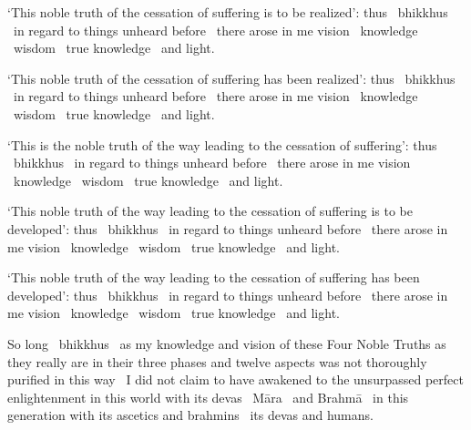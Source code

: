 \begin{english-hang}
`This noble truth of the cessation of suffering is to be realized': thus \breathmark\ bhikkhus \breathmark\ in regard to things unheard before \breathmark\ there arose in me vision \breathmark\ knowledge \breathmark\ wisdom \breathmark\ true knowledge \breathmark\ and light.
\end{english-hang}

\begin{english-hang}
`This noble truth of the cessation of suffering has been realized': thus \breathmark\ bhikkhus \breathmark\ in regard to things unheard before \breathmark\ there arose in me vision \breathmark\ knowledge \breathmark\ wisdom \breathmark\ true knowledge \breathmark\ and light.
\end{english-hang}

\begin{english-hang}
`This is the noble truth of the way leading to the cessation of suffering': thus \breathmark\ bhikkhus \breathmark\ in regard to things unheard before \breathmark\ there arose in me vision \breathmark\ knowledge \breathmark\ wisdom \breathmark\ true knowledge \breathmark\ and light.
\end{english-hang}

\begin{english-hang}
`This noble truth of the way leading to the cessation of suffering is to be developed': thus \breathmark\ bhikkhus \breathmark\ in regard to things unheard before \breathmark\ there arose in me vision \breathmark\ knowledge \breathmark\ wisdom \breathmark\ true knowledge \breathmark\ and light.
\end{english-hang}

\begin{english-hang}
`This noble truth of the way leading to the cessation of suffering has been developed': thus \breathmark\ bhikkhus \breathmark\ in regard to things unheard before \breathmark\ there arose in me vision \breathmark\ knowledge \breathmark\ wisdom \breathmark\ true knowledge \breathmark\ and light.
\end{english-hang}

\begin{english-hang}
So long \breathmark\ bhikkhus \breathmark\ as my knowledge and vision of these Four Noble Truths as they really are in their three phases and twelve aspects was not thoroughly purified in this way \breathmark\ I did not claim to have awakened to the unsurpassed perfect enlightenment in this world with its devas \breathmark\ Māra \breathmark\ and Brahmā \breathmark\ in this generation with its ascetics and brahmins \breathmark\ its devas and humans.
\end{english-hang}

